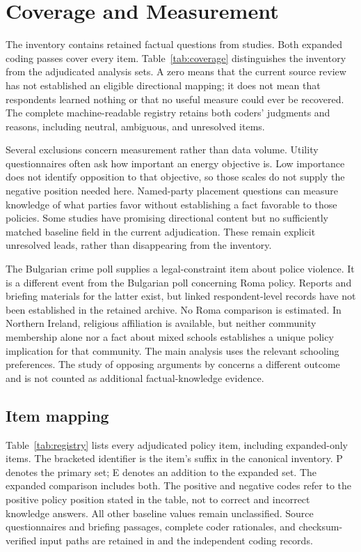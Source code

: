 \section{Coverage and Measurement}

The inventory contains \inventoryItems{} retained factual questions from \inventoryStudies{} studies. Both expanded coding passes cover every item. Table~\ref{tab:coverage} distinguishes the inventory from the adjudicated analysis sets. A zero means that the current source review has not established an eligible directional mapping; it does not mean that respondents learned nothing or that no useful measure could ever be recovered. The complete machine-readable registry retains both coders' judgments and reasons, including neutral, ambiguous, and unresolved items.

Several exclusions concern measurement rather than data volume. Utility questionnaires often ask how important an energy objective is. Low importance does not identify opposition to that objective, so those scales do not supply the negative position needed here. Named-party placement questions can measure knowledge of what parties favor without establishing a fact favorable to those policies. Some studies have promising directional content but no sufficiently matched baseline field in the current adjudication. These remain explicit unresolved leads, rather than disappearing from the inventory.

The Bulgarian crime poll supplies a legal-constraint item about police violence. It is a different event from the Bulgarian poll concerning Roma policy. Reports and briefing materials for the latter exist, but linked respondent-level records have not been established in the retained archive. No Roma comparison is estimated. In Northern Ireland, religious affiliation is available, but neither community membership alone nor a fact about mixed schools establishes a unique policy implication for that community. The main analysis uses the relevant schooling preferences. The study of opposing arguments by \citet{sood2026arguments} concerns a different outcome and is not counted as additional factual-knowledge evidence.

{\small{}

}

\subsection{Item mapping}

Table~\ref{tab:registry} lists every adjudicated policy item, including expanded-only items. The bracketed identifier is the item's suffix in the canonical inventory. P denotes the primary set; E denotes an addition to the expanded set. The expanded comparison includes both. The positive and negative codes refer to the positive policy position stated in the table, not to correct and incorrect knowledge answers. All other baseline values remain unclassified. Source questionnaires and briefing passages, complete coder rationales, and checksum-verified input paths are retained in  and the independent coding records.

